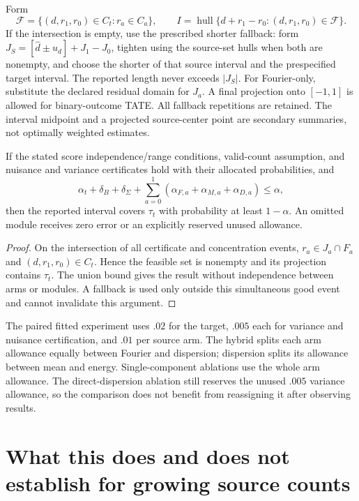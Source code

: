 Form
\[
 \mathcal F=\{(d,r_1,r_0)\in C_t:r_a\in C_a\},\qquad
 I=\operatorname{hull}\{d+r_1-r_0:(d,r_1,r_0)\in\mathcal F\}.
\]
If the intersection is empty, use the prescribed shorter fallback: form
$J_S=[\hat d\pm u_d]+J_1-J_0$, tighten using the source-set hulls when
both are nonempty, and choose the shorter of that source interval and the
prespecified target interval. The reported length never exceeds $|J_S|$.
For Fourier-only, substitute the declared residual domain for $J_a$.
A final projection onto $[-1,1]$ is allowed for binary-outcome TATE.
All fallback repetitions are retained. The interval midpoint and a projected
source-center point are secondary summaries, not optimally weighted estimates.

\begin{proposition}
If the stated score independence/range conditions, valid-count assumption,
and nuisance and variance certificates hold with their allocated probabilities,
and
\[
 \alpha_t+\delta_B+\delta_\Sigma+
 \sum_{a=0}^1(\alpha_{F,a}+\alpha_{M,a}+\alpha_{D,a})\le\alpha,
\]
then the reported interval covers $\tau_t$ with probability at least $1-\alpha$.
An omitted module receives zero error or an explicitly reserved unused allowance.
\end{proposition}
\begin{proof}
On the intersection of all certificate and concentration events,
$r_a\in J_a\cap F_a$ and $(d,r_1,r_0)\in C_t$. Hence the feasible set is
nonempty and its projection contains $\tau_t$. The union bound gives the
result without independence between arms or modules. A fallback is used only
outside this simultaneous good event and cannot invalidate this argument.
\end{proof}

The paired fitted experiment uses $.02$ for the target, $.005$ each for
variance and nuisance certification, and $.01$ per source arm. The hybrid
splits each arm allowance equally between Fourier and dispersion; dispersion
splits its allowance between mean and energy. Single-component ablations use
the whole arm allowance. The direct-dispersion ablation still reserves the
unused $.005$ variance allowance, so the comparison does not benefit from
reassigning it after observing results.

\section{What this does and does not establish for growing source counts}

